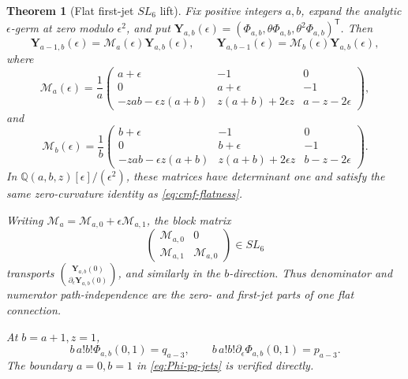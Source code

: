 \documentclass[11pt]{article}
\theoremstyle{keio}
\newtheorem{theorem}{Theorem}[section]
\theoremstyle{definition}
\theoremstyle{remark}
\newcommand{\Q}{\mathbb Q}
\begin{document}
\begin{theorem}[Flat first-jet \(SL_6\) lift]
\label{thm:ram-sl6}
Fix positive integers \(a,b\), expand the analytic \(\epsilon\)-germ at
zero modulo \(\epsilon^2\), and put
\(\mathbf Y_{a,b}(\epsilon)
=(\Phi_{a,b},\theta\Phi_{a,b},\theta^2\Phi_{a,b})^{\mathsf T}\).
Then
\begin{equation}\label{eq:epsilon-contiguous}
 \mathbf Y_{a-1,b}(\epsilon)=\mathscr M_a(\epsilon)\mathbf Y_{a,b}(\epsilon),
 \qquad
 \mathbf Y_{a,b-1}(\epsilon)=\mathscr M_b(\epsilon)\mathbf Y_{a,b}(\epsilon),
\end{equation}
where
\begin{equation}\label{eq:epsilon-Ma}
 \mathscr M_a(\epsilon)=\frac1a
 \begin{pmatrix}
 a+\epsilon&-1&0\\
 0&a+\epsilon&-1\\
 -zab-\epsilon z(a+b)&z(a+b)+2\epsilon z&a-z-2\epsilon
 \end{pmatrix},
\end{equation}
and
\begin{equation}\label{eq:epsilon-Mb}
 \mathscr M_b(\epsilon)=\frac1b
 \begin{pmatrix}
 b+\epsilon&-1&0\\
 0&b+\epsilon&-1\\
 -zab-\epsilon z(a+b)&z(a+b)+2\epsilon z&b-z-2\epsilon
 \end{pmatrix}.
\end{equation}
In
\(\Q(a,b,z)[\epsilon]/(\epsilon^2)\), these matrices have determinant one
and satisfy the same zero-curvature identity as
\eqref{eq:cmf-flatness}.

Writing
\(\mathscr M_a=\mathscr M_{a,0}+\epsilon\mathscr M_{a,1}\), the block matrix
\begin{equation}\label{eq:SL6-block}
 \begin{pmatrix}
 \mathscr M_{a,0}&0\\
 \mathscr M_{a,1}&\mathscr M_{a,0}
 \end{pmatrix}\in SL_6
\end{equation}
transports
\(\binom{\mathbf Y_{a,b}(0)}
{\partial_\epsilon\mathbf Y_{a,b}(0)}\), and similarly in the
\(b\)-direction.  Thus denominator and numerator path-independence are the
zero- and first-jet parts of one flat connection.

At \(b=a+1,z=1\),
\begin{equation}\label{eq:Phi-pq-jets}
 b\,a!b!\Phi_{a,b}(0,1)=q_{a-3},\qquad
 b\,a!b!\partial_\epsilon\Phi_{a,b}(0,1)=p_{a-3}.
\end{equation}
The boundary \(a=0,b=1\) in \eqref{eq:Phi-pq-jets} is verified directly.
\end{theorem}
\end{document}
